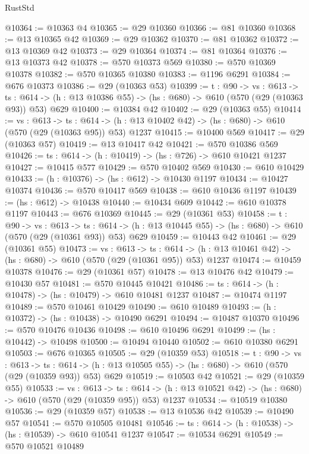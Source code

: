 \begin{lexlean}{RustStd}
\begin{coremodule}
@10364 := @10363 @4
@10365 := @29 @10360
@10366 := @81 @10360
@10368 := @13 @10365 @42
@10369 := @29 @10362
@10370 := @81 @10362
@10372 := @13 @10369 @42
@10373 := @29 @10364
@10374 := @81 @10364
@10376 := @13 @10373 @42
@10378 := @570 @10373 @569
@10380 := @570 @10369 @10378
@10382 := @570 @10365 @10380
@10383 := @1196 @6291
@10384 := @676 @10373
@10386 := @29 (@10363 @53)
@10399 := {t : @90} ->
  {vs : @613} ->
  {ts : @614} -> (h : @13 @10386 @55) -> (hs : @680) -> @610 (@570 (@29 (@10363 @93)) @53) @629
@10400 := @10384 @42
@10402 := @29 (@10363 @55)
@10414 := {vs : @613} ->
  {ts : @614} -> (h : @13 @10402 @42) -> (hs : @680) -> @610 (@570 (@29 (@10363 @95)) @53) @1237
@10415 := @10400 @569
@10417 := @29 (@10363 @57)
@10419 := @13 @10417 @42
@10421 := @570 @10386 @569
@10426 := {ts : @614} -> (h : @10419) -> (hs : @726) -> @610 @10421 @1237
@10427 := @10415 @577
@10429 := @570 @10402 @569
@10430 := @610 @10429
@10433 := (h : @10376) -> (hs : @612) -> @10430 @1197
@10434 := @10427 @10374
@10436 := @570 @10417 @569
@10438 := @610 @10436 @1197
@10439 := (hs : @612) -> @10438
@10440 := @10434 @609
@10442 := @610 @10378 @1197
@10443 := @676 @10369
@10445 := @29 (@10361 @53)
@10458 := {t : @90} ->
  {vs : @613} ->
  {ts : @614} -> (h : @13 @10445 @55) -> (hs : @680) -> @610 (@570 (@29 (@10361 @93)) @53) @629
@10459 := @10443 @42
@10461 := @29 (@10361 @55)
@10473 := {vs : @613} ->
  {ts : @614} -> (h : @13 @10461 @42) -> (hs : @680) -> @610 (@570 (@29 (@10361 @95)) @53) @1237
@10474 := @10459 @10378
@10476 := @29 (@10361 @57)
@10478 := @13 @10476 @42
@10479 := @10430 @57
@10481 := @570 @10445 @10421
@10486 := {ts : @614} -> (h : @10478) -> (hs : @10479) -> @610 @10481 @1237
@10487 := @10474 @1197
@10489 := @570 @10461 @10429
@10490 := @610 @10489
@10493 := (h : @10372) -> (hs : @10438) -> @10490 @6291
@10494 := @10487 @10370
@10496 := @570 @10476 @10436
@10498 := @610 @10496 @6291
@10499 := (hs : @10442) -> @10498
@10500 := @10494 @10440
@10502 := @610 @10380 @6291
@10503 := @676 @10365
@10505 := @29 (@10359 @53)
@10518 := {t : @90} ->
  {vs : @613} ->
  {ts : @614} -> (h : @13 @10505 @55) -> (hs : @680) -> @610 (@570 (@29 (@10359 @93)) @53) @629
@10519 := @10503 @42
@10521 := @29 (@10359 @55)
@10533 := {vs : @613} ->
  {ts : @614} -> (h : @13 @10521 @42) -> (hs : @680) -> @610 (@570 (@29 (@10359 @95)) @53) @1237
@10534 := @10519 @10380
@10536 := @29 (@10359 @57)
@10538 := @13 @10536 @42
@10539 := @10490 @57
@10541 := @570 @10505 @10481
@10546 := {ts : @614} -> (h : @10538) -> (hs : @10539) -> @610 @10541 @1237
@10547 := @10534 @6291
@10549 := @570 @10521 @10489

\end{coremodule}
\end{lexlean}
